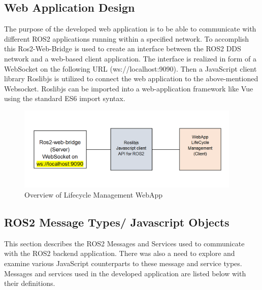 \subsection{Web Application Design}
The purpose of the developed web application is to be able to communicate with different ROS2 applications running within a specified network. To accomplish this Ros2-Web-Bridge is used to create an interface between the ROS2 DDS network and a web-based client application. The interface is realized in form of a WebSocket on the following URL (ws://localhost:9090). Then a JavaScript client library Roslibjs is utilized to connect the web application to the above-mentioned Websocket. Roslibjs can be imported into a web-application framework like Vue using the standard ES6 import syntax.
	\begin{figure}[H]
		\centering
		\includegraphics[width=0.95\textwidth]{"Bilder/webapp-design.png"}
		\caption{Overview of Lifecycle Management WebApp}
		\label{fig:Background:WebappDesign}					
	\end{figure}

\subsection{ROS2 Message Types/ Javascript Objects}
This section describes the ROS2 Messages and Services used to communicate with the ROS2 backend application. There was also a need to explore and examine various JavaScript counterparts to these message and service types. Messages and services  used in the developed application are listed below with their definitions. 

